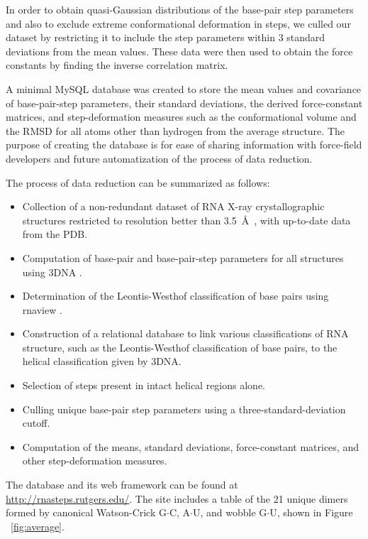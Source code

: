 In order to obtain  quasi-Gaussian distributions of the base-pair step
parameters and  also to exclude extreme  conformational deformation in
steps, we  culled our  dataset by restricting  it to include  the step
parameters within  3 standard deviations  from the mean  values. These
data  were then  used to  obtain the  force constants  by  finding the
inverse correlation matrix.

A  minimal MySQL database  was created  to store  the mean  values and
covariance  of base-pair-step  parameters, their  standard deviations,
the  derived force-constant  matrices,  and step-deformation  measures
such as  the conformational  volume and the  RMSD for all  atoms other
than hydrogen from the average  structure. The purpose of creating the
database  is   for  ease  of  sharing   information  with  force-field
developers and future automatization of the process of data reduction.

The process of data reduction can be summarized as follows:
\begin{itemize}
\item{Collection   of   a   non-redundant   dataset   of   RNA   X-ray
crystallographic  structures  restricted  to resolution  better  than
3.5~\AA ~, with up-to-date data from the PDB.}
\item{Computation of  base-pair and base-pair-step  parameters for all
    structures using 3DNA \cite{lu2003}.}
\item{Determination   of   the   Leontis-Westhof   classification   of
base pairs using rnaview \cite{yang2003}.}
\item{Construction   of  a   relational  database   to   link  various
  classifications  of  RNA  structure,  such  as  the  Leontis-Westhof
  classification of base pairs, to the helical classification given by
  3DNA.}
\item{Selection of steps present in intact helical regions alone.}
\item{Culling    unique   base-pair    step    parameters   using    a
    three-standard-deviation cutoff.}
\item{Computation  of the  means, standard  deviations, force-constant
matrices, and other step-deformation measures.}
\end{itemize}  

The database and its web framework can be found at
\url{http://rnasteps.rutgers.edu/}.  The site  includes a  table of
the  21  unique dimers  formed  by  canonical Watson-Crick  G$\cdot$C,
A$\cdot$U, and wobble G$\cdot$U, shown in Figure ~\ref{fig:average}.


